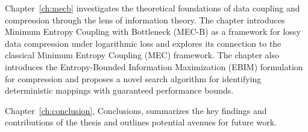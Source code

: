 Chapter~\ref{ch:mecb} investigates the theoretical foundations of data coupling and compression through the lens of information theory. The chapter introduces Minimum Entropy Coupling with Bottleneck (MEC-B) as a framework for lossy data compression under logarithmic loss and explores its connection to the classical Minimum Entropy Coupling (MEC) framework. The chapter also introduces the Entropy-Bounded Information Maximization (EBIM) formulation for compression and proposes a novel search algorithm for identifying deterministic mappings with guaranteed performance bounds. 

Chapter~\ref{ch:conclusion}, Conclusions, summarizes the key findings and contributions of the thesis and outlines potential avenues for future work. 